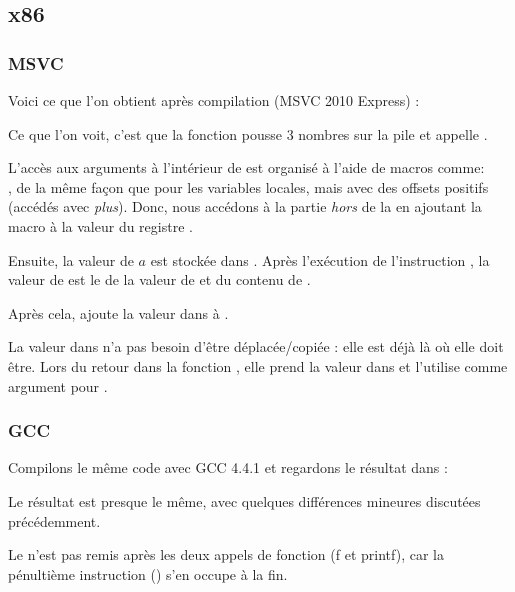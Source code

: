 \subsection{x86}

\subsubsection{MSVC}

Voici ce que l'on obtient après compilation (MSVC 2010 Express) :




Ce que l'on voit, c'est que la fonction \main pousse 3 nombres sur la pile et appelle
.

L'accès aux arguments à l'intérieur de \ttf est organisé à l'aide de macros
comme:\\
,
de la même façon que pour les variables locales, mais avec des offsets positifs
(accédés avec \emph{plus}).
Donc, nous accédons à la partie \emph{hors} de la 
en ajoutant la macro  à la valeur du registre \EBP.


Ensuite, la valeur de $a$ est stockée dans \EAX. Après l'exécution de l'instruction
\IMUL, la valeur de \EAX est le  de la valeur de \EAX
et du contenu de .

Après cela, \ADD ajoute la valeur dans  à \EAX.

La valeur dans \EAX n'a pas besoin d'être déplacée/copiée : elle est déjà là
où elle doit être.
Lors du retour dans la fonction , elle prend la valeur dans
\EAX et l'utilise comme argument pour \printf.



\subsubsection{GCC}

Compilons le même code avec GCC 4.4.1 et regardons le résultat dans \IDA :



Le résultat est presque le même, avec quelques différences mineures discutées
précédemment.

Le  n'est pas remis après les deux appels
de fonction (f et printf), car la pénultième instruction  ()
s'en occupe à la fin.
